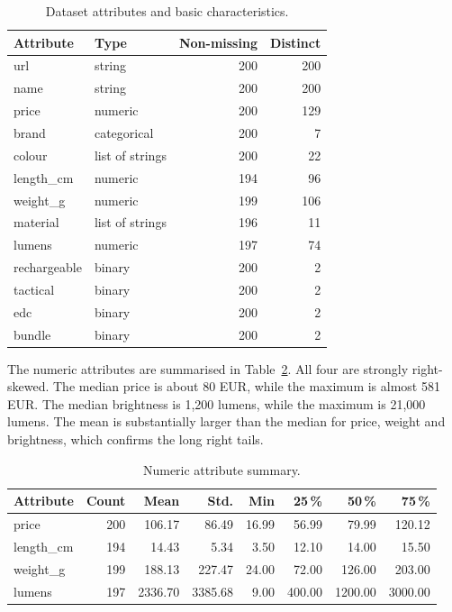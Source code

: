 \documentclass[11pt,a4paper]{article}
\begin{document}
\begin{table}[H]
\centering
\small
\caption{Dataset attributes and basic characteristics.}
\label{tab:overview}
\begin{tabular}{llrr}
\toprule
Attribute & Type & Non-missing & Distinct \\
\midrule
url & string & 200 & 200 \\
name & string & 200 & 200 \\
price & numeric & 200 & 129 \\
brand & categorical & 200 & 7 \\
colour & list of strings & 200 & 22 \\
length\_cm & numeric & 194 & 96 \\
weight\_g & numeric & 199 & 106 \\
material & list of strings & 196 & 11 \\
lumens & numeric & 197 & 74 \\
rechargeable & binary & 200 & 2 \\
tactical & binary & 200 & 2 \\
edc & binary & 200 & 2 \\
bundle & binary & 200 & 2 \\
\bottomrule
\end{tabular}
\end{table}

The numeric attributes are summarised in Table~\ref{tab:numeric}. All four are
strongly right-skewed. The median price is about 80 EUR, while the maximum is
almost 581 EUR. The median brightness is 1,200 lumens, while the maximum is
21,000 lumens. The mean is substantially larger than the median for price,
weight and brightness, which confirms the long right tails.

\begin{table}[H]
\centering
\small
\caption{Numeric attribute summary.}
\label{tab:numeric}
\begin{tabular}{lrrrrrrr}
\toprule
Attribute & Count & Mean & Std. & Min & 25\,\% & 50\,\% & 75\,\% \\
\midrule
price & 200 & 106.17 & 86.49 & 16.99 & 56.99 & 79.99 & 120.12 \\
length\_cm & 194 & 14.43 & 5.34 & 3.50 & 12.10 & 14.00 & 15.50 \\
weight\_g & 199 & 188.13 & 227.47 & 24.00 & 72.00 & 126.00 & 203.00 \\
lumens & 197 & 2336.70 & 3385.68 & 9.00 & 400.00 & 1200.00 & 3000.00 \\
\bottomrule
\end{tabular}
\end{table}
\end{document}
